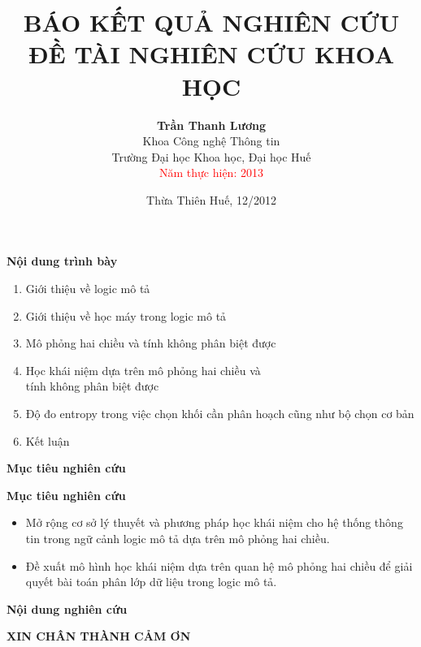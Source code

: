 \documentclass[fleqn]{beamer}
\title{\textbf{BÁO KẾT QUẢ NGHIÊN CỨU ĐỀ TÀI NGHIÊN CỨU KHOA HỌC}}
\author[]{
\textbf{Trần Thanh Lương}\\[3ex]
Khoa Công nghệ Thông tin\\
Trường Đại học Khoa học, Đại học Huế\\
\textcolor{red}{Năm thực hiện: 2013}
}
\date{Thừa Thiên Huế, 12/2012\\[2ex]}
\begin{document}
\begin{frame}
\titlepage
\end{frame}

\begin{frame}{\textbf{Nội dung trình bày}}
\begin{enumerate}
  \item Giới thiệu về logic mô tả
  \vspace{2.0ex}

  \item Giới thiệu về học máy trong logic mô tả
  \vspace{2.0ex}


  \item Mô phỏng hai chiều và tính không phân biệt được
  \vspace{2.0ex}

  \item Học khái niệm dựa trên mô phỏng hai chiều và\\ tính không phân biệt được
  \vspace{2.0ex}

  \item Độ đo entropy trong việc chọn khối cần phân hoạch cũng như bộ chọn cơ bản
  \vspace{2.0ex}

  \item Kết luận
\end{enumerate}
\end{frame}


\begin{frame}{\textbf{Mục tiêu nghiên cứu}}
  \begin{block}{\textbf{Mục tiêu nghiên cứu}}
    \begin{itemize}
      \item Mở rộng cơ sở lý thuyết và phương pháp học khái niệm cho hệ thống thông tin trong ngữ cảnh logic mô tả dựa trên mô phỏng hai chiều.
      \item Đề xuất mô hình học khái niệm dựa trên quan hệ mô phỏng hai chiều để giải quyết bài toán phân lớp dữ liệu trong logic mô tả.
    \end{itemize}
  \end{block}
  
\end{frame}

\begin{frame}{\textbf{Nội dung nghiên cứu}}

\end{frame}


\begin{frame}{}
\begin{center}
  \LARGE{\textbf{XIN CHÂN THÀNH CẢM ƠN}}
\end{center}
\end{frame}
\end{document}
